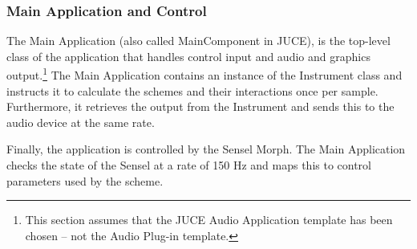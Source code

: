 \subsubsection{Main Application and Control}
The Main Application (also called MainComponent in JUCE), is the top-level class of the application that handles control input and audio and graphics output.\footnote{This section assumes that the JUCE Audio Application template has been chosen -- not the Audio Plug-in template.} The Main Application contains an instance of the Instrument class and instructs it to calculate the schemes and their interactions once per sample. Furthermore, it retrieves the output from the Instrument and sends this to the audio device at the same rate.

Finally, the application is controlled by the Sensel Morph. The Main Application checks the state of the Sensel at a rate of 150 Hz and maps this to control parameters used by the scheme.








